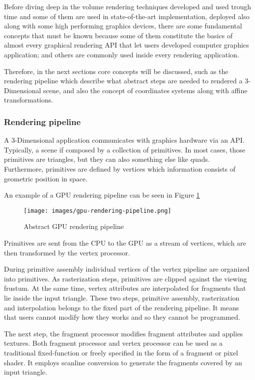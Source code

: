 \documentclass[12pt,a4paper]{extarticle}
\begin{document}
Before diving deep in the volume rendering techniques developed and used trough time and some of them are  used in state-of-the-art implementation, deployed also along with some high performing graphics devices, there are some fundamental concepts that must be known because some of them constitute the basics of almost every graphical rendering API that let users developed computer graphics application; and others are commonly used inside every rendering application.


Therefore, in the next sections core concepts will be discussed, such as the rendering pipeline which describe what abstract steps are needed to rendered a 3-Dimensional scene, and also the concept of coordinates systems along with affine transformations. 

\subsubsection{Rendering pipeline} 
A 3-Dimensional application communicates with graphics hardware via an API. Typically, a scene if composed by a collection of primitives. In most cases, those primitives are triangles, but they can also something else like quads.
Furthermore, primitives are defined by vertices which information consists of geometric position in space.

An example of a GPU rendering pipeline can be seen in Figure \ref{fig:renderingpipeline} 

\begin{figure}[hbtp]

\centering
\texttt{[image: images/gpu-rendering-pipeline.png]}
\caption{Abstract GPU rendering pipeline}
\label{fig:renderingpipeline}
\end{figure}

Primitives are sent from the CPU to the GPU as a stream of vertices, which are then transformed by the vertex processor.

During primitive assembly individual vertices of the vertex pipeline are organized into primitives. As rasterization steps, primitives are clipped against the viewing frustum. At the same time, vertex attributes are interpolated for fragments that lie inside the input triangle. These two steps, primitive assembly, rasterization and interpolation belongs to the fixed part of the rendering pipeline. It means that users cannot modify how they works and so they cannot be programmed.

The next step, the fragment processor modifies fragment attributes and applies textures.
Both fragment processor and vertex processor can be used as a traditional fixed-function or freely specified in the form of a fragment or pixel shader. It employs scanline conversion to generate the fragments covered by an input triangle.
\end{document}
